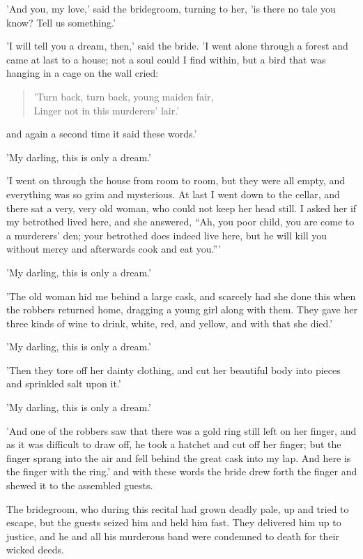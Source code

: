 \documentclass[12pt]{book}
\begin{document}
'And you, my love,' said the bridegroom, turning to her, 'is there no
tale you know? Tell us something.'

'I will tell you a dream, then,' said the bride. 'I went alone through
a forest and came at last to a house; not a soul could I find within,
but a bird that was hanging in a cage on the wall cried:

\begin{verse}
 'Turn back, turn back, young maiden fair,\\
  Linger not in this murderers' lair.'
\end{verse}

and again a second time it said these words.'

'My darling, this is only a dream.'

'I went on through the house from room to room, but they were all
empty, and everything was so grim and mysterious. At last I went down
to the cellar, and there sat a very, very old woman, who could not
keep her head still. I asked her if my betrothed lived here, and she
answered, ``Ah, you poor child, you are come to a murderers' den; your
betrothed does indeed live here, but he will kill you without mercy
and afterwards cook and eat you.'''

'My darling, this is only a dream.'

'The old woman hid me behind a large cask, and scarcely had she done
this when the robbers returned home, dragging a young girl along with
them. They gave her three kinds of wine to drink, white, red, and
yellow, and with that she died.'

'My darling, this is only a dream.'

'Then they tore off her dainty clothing, and cut her beautiful body
into pieces and sprinkled salt upon it.'

'My darling, this is only a dream.'

'And one of the robbers saw that there was a gold ring still left on
her finger, and as it was difficult to draw off, he took a hatchet and
cut off her finger; but the finger sprang into the air and fell behind
the great cask into my lap. And here is the finger with the ring.' and
with these words the bride drew forth the finger and shewed it to the
assembled guests.

The bridegroom, who during this recital had grown deadly pale, up and
tried to escape, but the guests seized him and held him fast. They
delivered him up to justice, and he and all his murderous band were
condemned to death for their wicked deeds.
\end{document}
